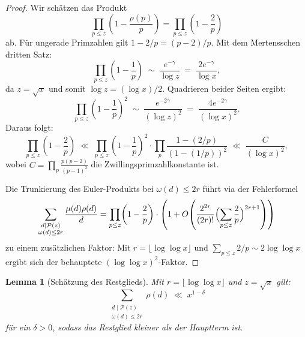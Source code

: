 \documentclass[12pt,a4paper]{amsart}
\newtheorem{lemma}[theorem]{Lemma}
\theoremstyle{definition}
\begin{document}
\begin{proof}
  Wir schätzen das Produkt
  \[
    \prod_{p \leq z} \left(1 - \frac{\rho(p)}{p}\right)
    = \prod_{p \leq z} \left(1 - \frac{2}{p}\right)
  \]
  ab.  %
  Für ungerade Primzahlen gilt $1 - 2/p = (p-2)/p$.  Mit dem Mertensschen
  dritten Satz:
  \[
    \prod_{p \leq z} \left(1 - \frac{1}{p}\right)
    \;\sim\; \frac{e^{-\gamma}}{\log z}
    \;=\; \frac{2e^{-\gamma}}{\log x},
  \]
  da $z = \sqrt{x}$ und somit $\log z = (\log x)/2$.  Quadrieren beider Seiten ergibt:
  \[
    \prod_{p \leq z} \left(1 - \frac{1}{p}\right)^2
    \;\sim\; \frac{e^{-2\gamma}}{(\log z)^2}
    \;=\; \frac{4e^{-2\gamma}}{(\log x)^2}.
  \]
  Daraus folgt:
  \[
    \prod_{p \leq z} \left(1 - \frac{2}{p}\right)
    \;\ll\; \prod_{p \leq z} \left(1 - \frac{1}{p}\right)^2
    \cdot \prod_p \frac{1-(2/p)}{(1-(1/p))^2}
    \;\ll\; \frac{C}{(\log x)^2},
  \]
  wobei $C = \prod_p \frac{p(p-2)}{(p-1)^2}$ die Zwillingsprimzahlkonstante ist.

  Die Trunkierung des Euler-Produkts bei $\omega(d) \leq 2r$ führt via der Fehlerformel
  \[
    \sum_{\substack{d \mid \mathcal{P}(z)\\ \omega(d) \leq 2r}}
    \frac{\mu(d)\rho(d)}{d}
    = \prod_{p \leq z}\!\left(1-\frac{2}{p}\right)
      \cdot \left(1 + O\!\left(\frac{2^{2r}}{(2r)!}
        \Bigl(\sum_{p\leq z}\frac{2}{p}\Bigr)^{2r+1}\right)\right)
  \]
  zu einem zusätzlichen Faktor: Mit $r = \lfloor\log\log x\rfloor$ und
  $\sum_{p\leq z} 2/p \sim 2\log\log x$ ergibt sich der behauptete $(\log\log x)^2$-Faktor.
\end{proof}

\begin{lemma}[Schätzung des Restglieds]\label{lem:restglied}
  Mit $r = \lfloor\log\log x\rfloor$ und $z = \sqrt{x}$ gilt:
  \[
    \sum_{\substack{d \mid \mathcal{P}(z)\\ \omega(d)\leq 2r}} \rho(d)
    \;\ll\; x^{1-\delta}
  \]
  für ein $\delta > 0$, sodass das Restglied kleiner als der Hauptterm ist.
\end{lemma}
\end{document}
